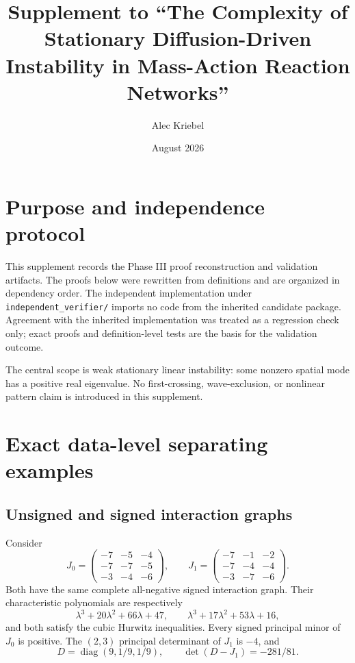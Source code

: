 \documentclass[11pt]{article}
\title{Supplement to ``The Complexity of Stationary Diffusion-Driven Instability in Mass-Action Reaction Networks''}
\author{Alec Kriebel}
\date{August 2026}
\theoremstyle{definition}
\newcommand{\diag}{\operatorname{diag}}
\begin{document}
\maketitle
\tableofcontents

\section{Purpose and independence protocol}

This supplement records the Phase III proof reconstruction and validation
artifacts.  The proofs below were rewritten from definitions and are organized
in dependency order.  The independent implementation under
\texttt{independent\_verifier/} imports no code from the inherited candidate
package.  Agreement with the inherited implementation was treated as a
regression check only; exact proofs and definition-level tests are the basis
for the validation outcome.

The central scope is weak stationary linear instability: some nonzero spatial
mode has a positive real eigenvalue.  No first-crossing, wave-exclusion, or
nonlinear pattern claim is introduced in this supplement.













\section{Exact data-level separating examples}

\subsection{Unsigned and signed interaction graphs}

Consider
\[
J_0=\begin{pmatrix}
-7&-5&-4\\-7&-7&-5\\-3&-4&-6
\end{pmatrix},\qquad
J_1=\begin{pmatrix}
-7&-1&-2\\-7&-4&-4\\-3&-7&-6
\end{pmatrix}.
\]
Both have the same complete all-negative signed interaction graph.  Their
characteristic polynomials are respectively
\[
 \lambda^3+20\lambda^2+66\lambda+47,
 \qquad
 \lambda^3+17\lambda^2+53\lambda+16,
\]
and both satisfy the cubic Hurwitz inequalities.  Every signed principal minor
of $J_0$ is positive.  The $(2,3)$ principal determinant of $J_1$ is $-4$, and
\[
 D=\diag(9,1/9,1/9),\qquad \det(D-J_1)=-281/81.
\]
\end{document}
